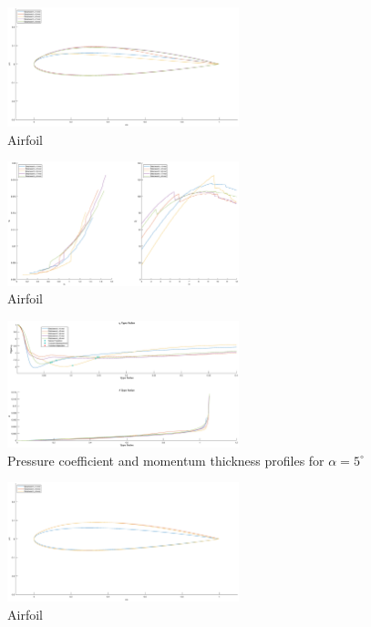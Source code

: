 \documentclass{article}
\begin{document}
\begin{figure}[H]
    \centering
    \includegraphics[width=0.6\textwidth]{figures/hiRe_geometry_8.eps}
    \caption{Airfoil}
    \label{fig:airfoil}
\end{figure}
\begin{figure}[H]
    \centering
    \includegraphics[width=0.6\textwidth]{figures/hiRe_lod_8.eps}
    \caption{Airfoil}
    \label{fig:airfoil}
\end{figure}
\begin{figure}[H]
    \centering
    \includegraphics[width=0.6\textwidth]{figures/hiRe_upperprofile_8_a5.eps}
    \caption{Pressure coefficient and momentum thickness profiles for $\alpha = 5^\circ$}
    \label{fig:airfoil}
\end{figure}
\begin{figure}[H]
    \centering
    \includegraphics[width=0.6\textwidth]{figures/hiRe_geometry_9.eps}
    \caption{Airfoil}
    \label{fig:airfoil}
\end{figure}
\end{document}
